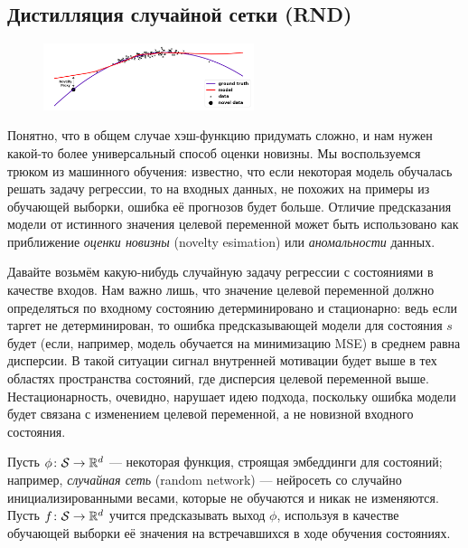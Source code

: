 \subsection{Дистилляция случайной сетки (RND)}

\begin{figure}
\vspace{-0.4cm}
\centering
\includegraphics[width=0.55\textwidth]{Images/novelty4.png}
\vspace{-0.5cm}
\end{figure}

Понятно, что в общем случае хэш-функцию придумать сложно, и нам нужен какой-то более универсальный способ оценки новизны. Мы воспользуемся трюком из машинного обучения: известно, что если некоторая модель обучалась решать задачу регрессии, то на входных данных, не похожих на примеры из обучающей выборки, ошибка её прогнозов будет больше. Отличие предсказания модели от истинного значения целевой переменной может быть использовано как приближение \emph{оценки новизны} (novelty esimation) или \emph{аномальности} данных.

Давайте возьмём какую-нибудь случайную задачу регрессии с состояниями в качестве входов. Нам важно лишь, что значение целевой переменной должно определяться по входному состоянию детерминировано и стационарно: ведь если таргет не детерминирован, то ошибка предсказывающей модели для состояния $s$ будет (если, например, модель обучается на минимизацию MSE) в среднем равна дисперсии. В такой ситуации сигнал внутренней мотивации будет выше в тех областях пространства состояний, где дисперсия целевой переменной выше. Нестационарность, очевидно, нарушает идею подхода, поскольку ошибка модели будет связана с изменением целевой переменной, а не новизной входного состояния. 

Пусть $\phi \colon \mathcal{S} \to \mathbb{R}^d$ --- некоторая функция, строящая эмбеддинги для состояний; например, \emph{случайная сеть} (random network) --- нейросеть со случайно инициализированными весами, которые не обучаются и никак не изменяются. Пусть $f \colon \mathcal{S} \to \mathbb{R}^d$ учится предсказывать выход $\phi$, используя в качестве обучающей выборки её значения на встречавшихся в ходе обучения состояниях.

